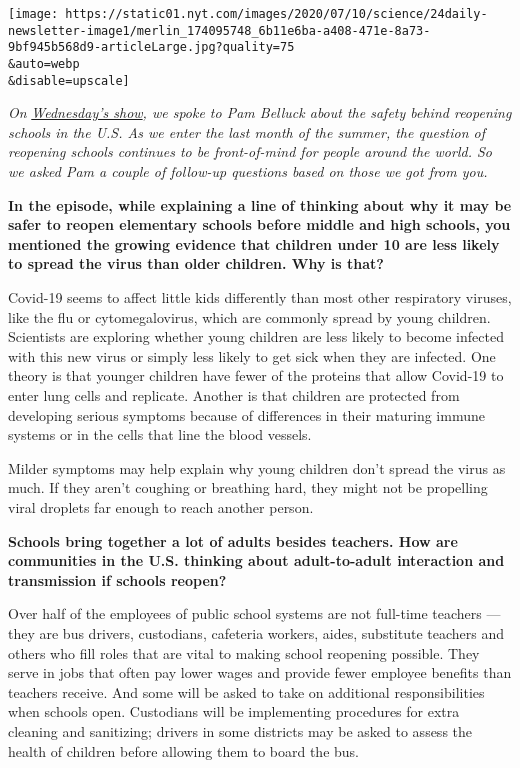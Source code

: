 \texttt{[image: https://static01.nyt.com/images/2020/07/10/science/24daily-newsletter-image1/merlin\_174095748\_6b11e6ba-a408-471e-8a73-9bf945b568d9-articleLarge.jpg?quality=75\\\&auto=webp\\\&disable=upscale]}

\emph{On}
\href{https://www.nytimes.com/2020/07/22/podcasts/the-daily/school-reopenings-coronavirus.html?}{\emph{Wednesday's
show}}\emph{, we spoke to Pam Belluck about the safety behind reopening
schools in the U.S. As we enter the last month of the summer, the
question of reopening schools continues to be front-of-mind for people
around the world. So we asked Pam a couple of follow-up questions based
on those we got from you.}

\textbf{In the episode, while explaining a line of thinking about why it
may be safer to reopen elementary schools before middle and high
schools, you mentioned the growing evidence that children under 10 are
less likely to spread the virus than older children. Why is that?}

Covid-19 seems to affect little kids differently than most other
respiratory viruses, like the flu or cytomegalovirus, which are commonly
spread by young children. Scientists are exploring whether young
children are less likely to become infected with this new virus or
simply less likely to get sick when they are infected. One theory is
that younger children have fewer of the proteins that allow Covid-19 to
enter lung cells and replicate. Another is that children are protected
from developing serious symptoms because of differences in their
maturing immune systems or in the cells that line the blood vessels.

Milder symptoms may help explain why young children don't spread the
virus as much. If they aren't coughing or breathing hard, they might not
be propelling viral droplets far enough to reach another person.

\textbf{Schools bring together a lot of adults besides teachers. How are
communities in the U.S. thinking about adult-to-adult interaction and
transmission if schools reopen?}

Over half of the employees of public school systems are not full-time
teachers --- they are bus drivers, custodians, cafeteria workers, aides,
substitute teachers and others who fill roles that are vital to making
school reopening possible. They serve in jobs that often pay lower wages
and provide fewer employee benefits than teachers receive. And some will
be asked to take on additional responsibilities when schools open.
Custodians will be implementing procedures for extra cleaning and
sanitizing; drivers in some districts may be asked to assess the health
of children before allowing them to board the bus.


